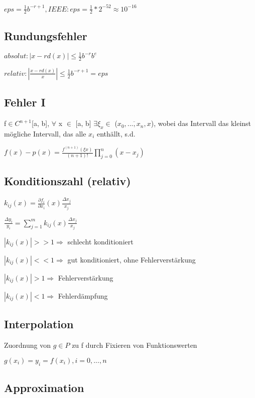 \documentclass[12pt,a4paper]{article} %
\begin{document}
	$eps = \frac{1}{2}b^{-r + 1}, IEEE: eps = \frac{1}{2} * 2^{-52} \approx 10^{-16}$
	
	\subsection{Rundungsfehler}
	
	$absolut: |x - rd(x)| \le \frac{1}{2}b^{-r}b^e$
	
	$relativ: |\frac{x - rd(x)}{x}| \le \frac{1}{2}b^{-r+1} = eps$
	
	\subsection{Fehler I}
	
	f$ \in C^{n+1}$[a, b], $\forall$ x $\in$ [a, b] $\exists \xi_x \in$ ($\overline{x_0, ..., x_n, x}$), wobei das Intervall das kleinst mögliche Intervall, das alle $x_i$ enthällt, s.d.
	
	$f(x) - p(x) = \frac{f^{(n+1)}(\xi x)}{(n+1)!} \prod\limits_{j = 0}^{n}(x - x_j)$
	
	\subsection{Konditionszahl (relativ)}
	
	$k_{ij}(x) = \frac{\partial f_i}{\partial x_i}(x) \frac{\Delta x_j}{x_j}$
	
	$\frac{\Delta y_i}{y_i} = \sum\limits_{j = 1}^{m}k_{ij}(x)\frac{\Delta x_j}{x_j}$
	
	$|k_{ij}(x)| >> 1 \Rightarrow$ schlecht konditioniert
	
	$|k_{ij}(x)| << 1 \Rightarrow$ gut konditioniert, ohne Fehlerverstärkung
	
	$|k_{ij}(x)| > 1 \Rightarrow$ Fehlerverstärkung
	
	$|k_{ij}(x)| < 1 \Rightarrow$ Fehlerdämpfung
	
	\subsection{Interpolation}
	
	Zuordnung von $g \in P$ zu f durch Fixieren von Funktionswerten
	
	$g(x_i) = y_i = f(x_i), i = 0, ..., n$
	
	\subsection{Approximation}
	
\end{document}
